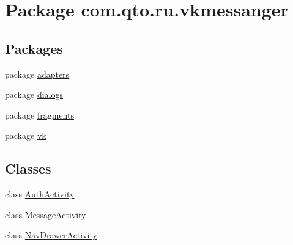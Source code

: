 \hypertarget{namespacecom_1_1qto_1_1ru_1_1vkmessanger}{}\section{Package com.\+qto.\+ru.\+vkmessanger}
\label{namespacecom_1_1qto_1_1ru_1_1vkmessanger}
\subsection*{Packages}
\begin{DoxyCompactItemize}
\item 
package \hyperlink{namespacecom_1_1qto_1_1ru_1_1vkmessanger_1_1adapters}{adapters}
\item 
package \hyperlink{namespacecom_1_1qto_1_1ru_1_1vkmessanger_1_1dialogs}{dialogs}
\item 
package \hyperlink{namespacecom_1_1qto_1_1ru_1_1vkmessanger_1_1fragments}{fragments}
\item 
package \hyperlink{namespacecom_1_1qto_1_1ru_1_1vkmessanger_1_1vk}{vk}
\end{DoxyCompactItemize}
\subsection*{Classes}
\begin{DoxyCompactItemize}
\item 
class \hyperlink{classcom_1_1qto_1_1ru_1_1vkmessanger_1_1_auth_activity}{Auth\+Activity}
\item 
class \hyperlink{classcom_1_1qto_1_1ru_1_1vkmessanger_1_1_message_activity}{Message\+Activity}
\item 
class \hyperlink{classcom_1_1qto_1_1ru_1_1vkmessanger_1_1_nav_drawer_activity}{Nav\+Drawer\+Activity}
\end{DoxyCompactItemize}
